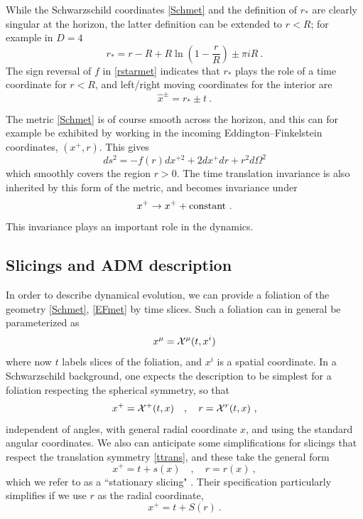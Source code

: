 \documentclass[11pt]{article}
\numberwithin{equation}{section}
\newcommand{\beq}{\begin{equation}}
\newcommand{\eeq}{\end{equation}}
\begin{document}
While the Schwarzschild coordinates \eqref{Schmet} and the definition of $r_*$ are clearly singular at the horizon, the latter definition can be extended to $r<R$;  for example in $D=4$
\beq
r_* =   r-R+R\ln\left(1-\frac{r}{R}\right) \pm\pi i R\ .
\eeq
The sign reversal of $f$ in \eqref{rstarmet} indicates that $r_*$ plays the role of a time coordinate for $r<R$, and left/right moving coordinates for the interior are
\beq
{\hat x}^\pm = r_*\pm t\ .
\eeq

The metric \eqref{Schmet} is of course smooth across the horizon, and this can for example be exhibited by working in the incoming Eddington--Finkelstein coordinates, $(x^+,r)$.  This gives
\beq
\label{EFmet}
ds^2 = -f(r) dx^{+2} + 2dx^+ dr + r^2 d\Omega^2
\eeq
which smoothly covers the region $r>0$.  The time translation invariance is also inherited by this form of the metric, and becomes invariance under
\beq\label{ttrans}
x^+\rightarrow x^+ + {\rm constant}\ .
\eeq
This invariance plays an important role in the dynamics.

\subsection{Slicings and ADM description}
\label{Slicesec}

In order to describe dynamical evolution, we can provide a foliation of the geometry \eqref{Schmet}, \eqref{EFmet} by time slices.  Such a foliation can in general be parameterized as 
\beq\label{sliceparam}
x^\mu= {\cal X}^\mu(t,x^i)
\eeq
where now $t$ labels slices of the foliation, and $x^i$ is a spatial coordinate. In a Schwarzschild background, one expects the description to be simplest for a foliation respecting the spherical symmetry, so that
\beq\label{xrparam}
x^+={\cal X}^+(t,x)\quad,\quad r={\cal X}^r(t,x)\ ,
\eeq
independent of angles, with general radial coordinate $x$, and using the standard angular coordinates.  We also can anticipate some simplifications for slicings that  respect the translation symmetry \eqref{ttrans}, and these take the general form
\beq\label{statgen}
x^+= t+ s(x)\quad,\quad r=r(x)\ ,
\eeq
which we refer to as a ``stationary slicing" \cite{NVU,SEHS}.
Their specification particularly simplifies if we use $r$ as the radial coordinate,
\beq\label{statS}
x^+= t+S(r)\ .
\eeq
\end{document}
